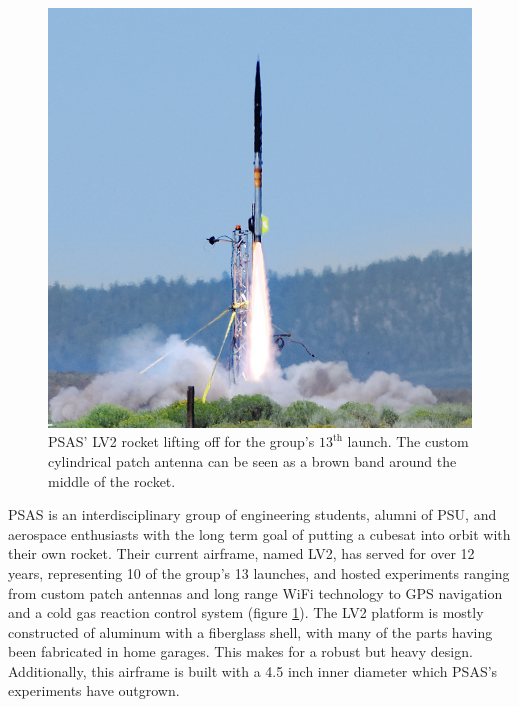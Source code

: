 \documentclass{aiaa-tc}%
\begin{document}
\begin{figure}
\centering
\includegraphics[width=\linewidth]{../img/L12-cropped.png}
\caption{PSAS' LV2 rocket lifting off for the group's $13^\text{th}$ launch. The custom cylindrical patch antenna can be seen as a brown band around the middle of the rocket.}
\label{fig:L-12}
\end{figure}

PSAS  is an interdisciplinary group of engineering students, alumni of PSU, and aerospace enthusiasts with the long term goal of putting a cubesat into orbit with their own rocket. 
Their current airframe, named LV2, has served for over 12 years, representing 10 of the group's 13 launches, and hosted experiments ranging from custom patch antennas and long range WiFi technology to GPS navigation and a cold gas reaction control system (figure \ref{fig:L-12}). The LV2 platform is mostly constructed of aluminum with a fiberglass shell, with many of the parts having been fabricated in home garages. This makes for a robust but heavy design. Additionally, this airframe is built with a 4.5 inch inner diameter which PSAS's experiments have outgrown. 
\end{document}
